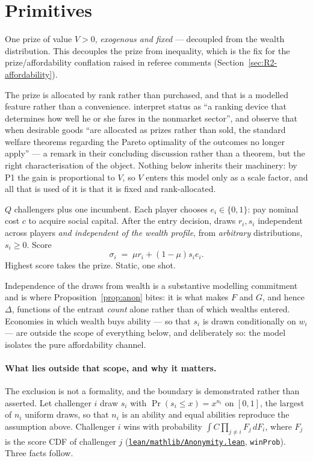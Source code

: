 \documentclass[11pt]{article}
\newcommand{\file}[1]{\href{run:#1}{\texttt{#1}}}
\begin{document}
\section{Primitives}
\label{sec:primitives}

One prize of value $V>0$, \emph{exogenous and fixed} --- decoupled from the
wealth distribution. This decouples the prize from inequality, which
is the fix for the prize/affordability conflation raised in referee
comments (Section~\ref{sec:R2-affordability}).

The prize is allocated by rank rather than purchased, and that is a modelled
feature rather than a convenience. \citet{ColeMailathPostlewaite1992} interpret
status as ``a ranking device that determines how well he or she fares in the
nonmarket sector'', and \citet{ColeMailathPostlewaite1995} observe that when
desirable goods ``are allocated as prizes rather than sold, the standard
welfare theorems regarding the Pareto optimality of the outcomes no longer
apply'' --- a remark in their concluding discussion rather than a theorem, but
the right characterisation of the object. Nothing below inherits their
machinery: by P1 the gain is proportional to $V$, so $V$ enters this model only
as a scale factor, and all that is used of it is that it is fixed and
rank-allocated.

$Q$ challengers plus one incumbent. Each player chooses $e_i\in\{0,1\}$:
pay nominal cost $c$ to acquire social capital. After the entry
decision, draws $r_i,s_i$ independent across players \emph{and independent of
the wealth profile}, from \emph{arbitrary} distributions, $s_i\ge0$. Score
\[
  \sigma_i \;=\; \mu r_i + (1-\mu)s_i e_i.
\]
Highest score takes the prize. Static, one shot.

Independence of the draws from wealth is a substantive modelling commitment and
is where Proposition~\ref{prop:anon} bites: it is what makes $F$ and $G$, and
hence $\Delta$, functions of the entrant \emph{count} alone rather than of
which wealths entered. Economies in which wealth buys ability --- so that
$s_i$ is drawn conditionally on $w_i$ --- are outside the scope of everything
below, and deliberately so: the model isolates the pure affordability channel.

\paragraph{What lies outside that scope, and why it matters.} The exclusion is
not a formality, and the boundary is demonstrated rather than asserted. Let
challenger $i$ draw $s_i$ with $\Pr(s_i\le x)=x^{n_i}$ on $[0,1]$, the largest
of $n_i$ uniform draws, so that $n_i$ is an ability and equal abilities
reproduce the assumption above. Challenger $i$ wins with probability
$\int C\prod_{j\ne i}F_j\,dF_i$, where $F_j$ is the score CDF of challenger
$j$ (\file{lean/mathlib/Anonymity.lean}, \texttt{winProb}). Three facts
follow.
\end{document}
